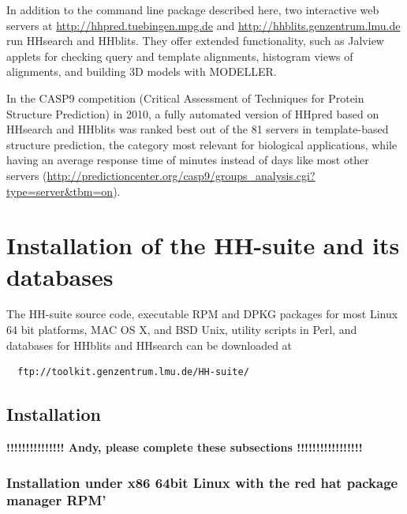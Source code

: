 \documentclass[11pt,a4paper]{article}
\begin{document}
In addition to the command line package described here, two interactive web servers at \url{http://hhpred.tuebingen.mpg.de} and \url{http://hhblits.genzentrum.lmu.de} run HHsearch and HHblits. They offer extended functionality, such as Jalview applets for checking query and template alignments, histogram views of alignments, and building 3D models with MODELLER. 

In the CASP9 competition (Critical Assessment of Techniques for Protein Structure Prediction) in 2010, a fully automated version of HHpred based on HHsearch and HHblits was ranked best out of the 81 servers in template-based structure prediction, the category most relevant for biological applications, while having an average response time of minutes instead of days like most other servers (\url{http://predictioncenter.org/casp9/groups_analysis.cgi?type=server&tbm=on}). 

\section{Installation of the HH-suite and its databases}

The HH-suite source code, executable RPM and DPKG packages for most Linux 64 bit platforms, MAC OS X, and BSD Unix, utility scripts in Perl, and databases for HHblits and HHsearch can be downloaded at
\begin{verbatim}
  ftp://toolkit.genzentrum.lmu.de/HH-suite/
\end{verbatim}


\subsection{Installation} \label{installation}

{\bf !!!!!!!!!!!!!!! Andy, please complete these subsections !!!!!!!!!!!!!!!!!}

\subsubsection*{Installation under x86 64bit Linux with the red hat package manager RPM'}
\end{document}
